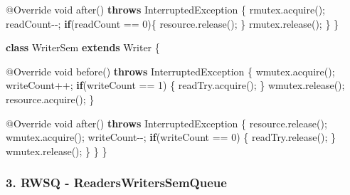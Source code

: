 \documentclass[
]{article}
\newenvironment{Shaded}{\begin{snugshade}}{\end{snugshade}}
\newcommand{\AttributeTok}[1]{\textcolor[rgb]{0.77,0.63,0.00}{#1}}
\newcommand{\BuiltInTok}[1]{#1}
\newcommand{\DataTypeTok}[1]{\textcolor[rgb]{0.13,0.29,0.53}{#1}}
\newcommand{\DecValTok}[1]{\textcolor[rgb]{0.00,0.00,0.81}{#1}}
\newcommand{\FunctionTok}[1]{\textcolor[rgb]{0.00,0.00,0.00}{#1}}
\newcommand{\KeywordTok}[1]{\textcolor[rgb]{0.13,0.29,0.53}{\textbf{#1}}}
\newcommand{\NormalTok}[1]{#1}
\begin{document}
\begin{Shaded}
\begin{Highlighting}[]
        \AttributeTok{@Override}
        \DataTypeTok{void} \FunctionTok{after}\NormalTok{() }\KeywordTok{throws} \BuiltInTok{InterruptedException}\NormalTok{ \{}
\NormalTok{            rmutex.}\FunctionTok{acquire}\NormalTok{();}
\NormalTok{            readCount{-}{-};}
            \KeywordTok{if}\NormalTok{(readCount == }\DecValTok{0}\NormalTok{)\{}
\NormalTok{                resource.}\FunctionTok{release}\NormalTok{();}
\NormalTok{            \}}
\NormalTok{            rmutex.}\FunctionTok{release}\NormalTok{();}
\NormalTok{        \}}
\NormalTok{    \}}

    \KeywordTok{class}\NormalTok{ WriterSem }\KeywordTok{extends} \BuiltInTok{Writer}\NormalTok{ \{}

        \AttributeTok{@Override}
        \DataTypeTok{void} \FunctionTok{before}\NormalTok{() }\KeywordTok{throws} \BuiltInTok{InterruptedException}\NormalTok{ \{}
\NormalTok{            wmutex.}\FunctionTok{acquire}\NormalTok{();}
\NormalTok{            writeCount++;}
            \KeywordTok{if}\NormalTok{(writeCount == }\DecValTok{1}\NormalTok{) \{}
\NormalTok{                readTry.}\FunctionTok{acquire}\NormalTok{();}
\NormalTok{            \}}
\NormalTok{            wmutex.}\FunctionTok{release}\NormalTok{();}
\NormalTok{            resource.}\FunctionTok{acquire}\NormalTok{();}
\NormalTok{        \}}

        \AttributeTok{@Override}
        \DataTypeTok{void} \FunctionTok{after}\NormalTok{() }\KeywordTok{throws} \BuiltInTok{InterruptedException}\NormalTok{ \{}
\NormalTok{            resource.}\FunctionTok{release}\NormalTok{();}
\NormalTok{            wmutex.}\FunctionTok{acquire}\NormalTok{();}
\NormalTok{            writeCount{-}{-};}
            \KeywordTok{if}\NormalTok{(writeCount == }\DecValTok{0}\NormalTok{) \{}
\NormalTok{                readTry.}\FunctionTok{release}\NormalTok{();}
\NormalTok{            \}}
\NormalTok{            wmutex.}\FunctionTok{release}\NormalTok{();}
\NormalTok{        \}}
\NormalTok{    \}}
\NormalTok{\}}
\end{Highlighting}
\end{Shaded}

\hypertarget{rwsq---readerswriterssemqueue}{%
\subsubsection{3. RWSQ -
ReadersWritersSemQueue}\label{rwsq---readerswriterssemqueue}}
\end{document}
